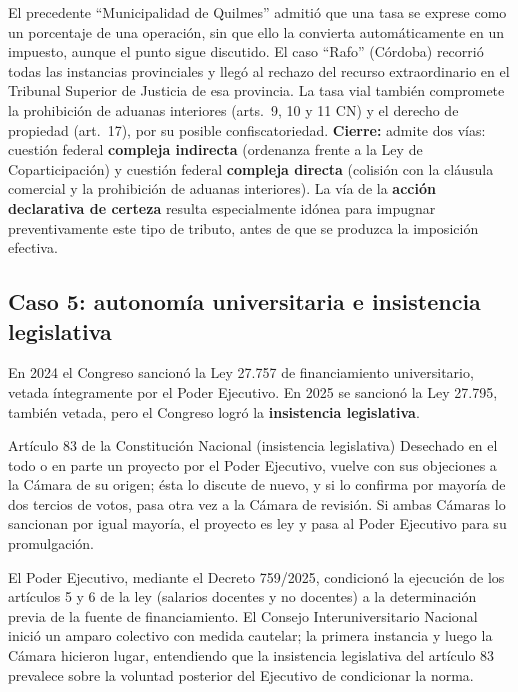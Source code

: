 \documentclass[12pt,oneside]{book}
\begin{document}
El precedente ``Municipalidad de Quilmes'' admitió que una tasa se exprese como un porcentaje de una operación, sin que ello la convierta automáticamente en un impuesto, aunque el punto sigue discutido. El caso ``Rafo'' (Córdoba) recorrió todas las instancias provinciales y llegó al rechazo del recurso extraordinario en el Tribunal Superior de Justicia de esa provincia. La tasa vial también compromete la prohibición de aduanas interiores (arts.\ 9, 10 y 11 CN) y el derecho de propiedad (art.\ 17), por su posible confiscatoriedad. \textbf{Cierre:} admite dos vías: cuestión federal \textbf{compleja indirecta} (ordenanza frente a la Ley de Coparticipación) y cuestión federal \textbf{compleja directa} (colisión con la cláusula comercial y la prohibición de aduanas interiores). La vía de la \textbf{acción declarativa de certeza} resulta especialmente idónea para impugnar preventivamente este tipo de tributo, antes de que se produzca la imposición efectiva.

\subsection{Caso 5: autonomía universitaria e insistencia legislativa}

En 2024 el Congreso sancionó la Ley 27.757 de financiamiento universitario, vetada íntegramente por el Poder Ejecutivo. En 2025 se sancionó la Ley 27.795, también vetada, pero el Congreso logró la \textbf{insistencia legislativa}.

\begin{norma}{Artículo 83 de la Constitución Nacional (insistencia legislativa)}
Desechado en el todo o en parte un proyecto por el Poder Ejecutivo, vuelve con sus objeciones a la Cámara de su origen; ésta lo discute de nuevo, y si lo confirma por mayoría de dos tercios de votos, pasa otra vez a la Cámara de revisión. Si ambas Cámaras lo sancionan por igual mayoría, el proyecto es ley y pasa al Poder Ejecutivo para su promulgación.
\end{norma}

El Poder Ejecutivo, mediante el Decreto 759/2025, condicionó la ejecución de los artículos 5 y 6 de la ley (salarios docentes y no docentes) a la determinación previa de la fuente de financiamiento. El Consejo Interuniversitario Nacional inició un amparo colectivo con medida cautelar; la primera instancia y luego la Cámara hicieron lugar, entendiendo que la insistencia legislativa del artículo 83 prevalece sobre la voluntad posterior del Ejecutivo de condicionar la norma.
\end{document}
